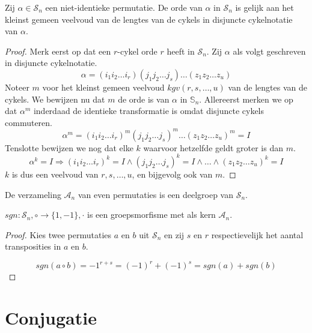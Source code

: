 \documentclass[main.tex]{subfiles}
\begin{document}
\begin{st}
  \examen
  Zij $\alpha \in \mathcal{S}_{n}$ een niet-identieke permutatie.
  De orde van $\alpha$ in $\mathcal{S}_{n}$ is gelijk aan het kleinst gemeen veelvoud van de lengtes van de cykels in disjuncte cykelnotatie van $\alpha$.

  \begin{proof}
    Merk eerst op dat een $r$-cykel orde $r$ heeft in $\mathcal{S}_{n}$.
    Zij $\alpha$ als volgt geschreven in disjuncte cykelnotatie.
    \[ \alpha = (i_{1}i_{2}\dotsc i_{r})(j_{1}j_{2}\dotsc j_{s})\dotsc(z_{1}z_{2}\dotsc z_{u}) \]
    Noteer $m$ voor het kleinst gemeen veelvoud $kgv(r,s,\dotsc,u)$ van de lengtes van de cykels.
    We bewijzen nu dat $m$ de orde is van $\alpha$ in $\mathbb{S}_{n}$.
    Allereerst merken we op dat $\alpha^{m}$ inderdaad de identieke transformatie is omdat disjuncte cykels commuteren.
    \[ \alpha^{m} = (i_{1}i_{2}\dotsc i_{r})^{m}(j_{1}j_{2}\dotsc j_{s})^{m}\dotsc(z_{1}z_{2}\dotsc z_{u})^{m} = I \]
    Tenslotte bewijzen we nog dat elke $k$ waarvoor hetzelfde geldt groter is dan $m$.
    \[ \alpha^{k} = I \Rightarrow (i_{1}i_{2}\dotsc i_{r})^{k} = I \wedge (j_{1}j_{2}\dotsc j_{s})^{k} = I \wedge \dotsc \wedge (z_{1}z_{2}\dotsc z_{u})^{k} = I \]
    $k$ is dus een veelvoud van $r,s,\dotsc,u$, en bijgevolg ook van $m$.
  \end{proof}
\end{st}

\begin{st}
  De verzameling $\mathcal{A}_{n}$ van even permutaties is een deelgroep van $\mathcal{S}_{n}$.
\end{st}

\begin{st}
  $sgn: \mathcal{S}_{n},\circ \rightarrow \{1,-1\},\cdot$ is een groepsmorfisme met als kern $\mathcal{A}_{n}$.

  \begin{proof}
    Kies twee permutaties $a$ en $b$ uit $\mathcal{S}_{n}$ en zij $s$ en $r$ respectievelijk het aantal transposities in $a$ en $b$.
    
    \[ sgn(a\circ b) = -1^{r+s} = (-1)^{r} + (-1)^{s} = sgn(a) + sgn(b) \]
  \end{proof}
\end{st}

\section{Conjugatie}
\label{sec:conjugatie}
\end{document}
